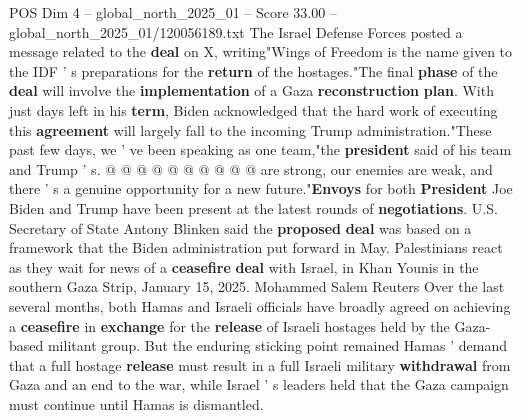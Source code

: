 \begin{textsample}{POS Dim 4 – global\_north\_2025\_01 – Score 33.00 – global\_north\_2025\_01/120056189.txt}
The Israel Defense Forces posted a message related to the \textbf{deal} on X, writing"Wings of Freedom is the name given to the IDF ' s preparations for the \textbf{return} of the hostages."The final \textbf{phase} of the \textbf{deal} will involve the \textbf{implementation} of a Gaza \textbf{reconstruction} \textbf{plan}.
With just days left in his \textbf{term}, Biden acknowledged that the hard work of executing this \textbf{agreement} will largely fall to the incoming Trump administration."These past few days, we ' ve been speaking as one team,"the \textbf{president} said of his team and Trump ' s. @ @ @ @ @ @ @ @ @ @ are strong, our enemies are weak, and there ' s a genuine opportunity for a new future."\textbf{Envoys} for both \textbf{President} Joe Biden and Trump have been present at the latest rounds of \textbf{negotiations}.
U.S.
Secretary of State Antony Blinken said the \textbf{proposed} \textbf{deal} was based on a framework that the Biden administration put forward in May.
Palestinians react as they wait for news of a \textbf{ceasefire} \textbf{deal} with Israel, in Khan Younis in the southern Gaza Strip, January 15, 2025.
Mohammed Salem Reuters Over the last several months, both Hamas and Israeli officials have broadly agreed on achieving a \textbf{ceasefire} in \textbf{exchange} for the \textbf{release} of Israeli hostages held by the Gaza-based militant group.
But the enduring sticking point remained Hamas ' demand that a full hostage \textbf{release} must result in a full Israeli military \textbf{withdrawal} from Gaza and an end to the war, while Israel ' s leaders held that the Gaza campaign must continue until Hamas is dismantled.

\end{textsample}
